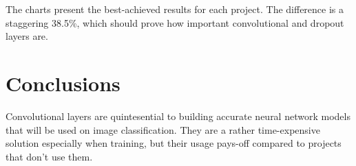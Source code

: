 \documentclass[conference]{IEEEtran}
\begin{document}
The charts present the best-achieved results for each project. The difference is a staggering 38.5\%, which should prove
how important convolutional and dropout layers are.

\section{Conclusions}
Convolutional layers are quintesential to building accurate neural network models that will be used on image classification.
They are a rather time-expensive solution especially when training, but their usage pays-off compared to projects that don't
use them.
\end{document}
